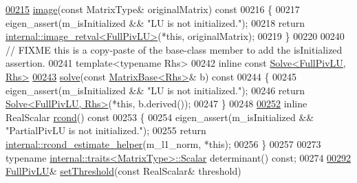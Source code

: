 \begin{DoxyCode}
\hyperlink{group___l_u___module_a0893985d2dab367baa6e57c6fd0c4956}{00215}       \hyperlink{group___l_u___module_a0893985d2dab367baa6e57c6fd0c4956}{image}(\textcolor{keyword}{const} MatrixType& originalMatrix)\textcolor{keyword}{ const}
00216 \textcolor{keyword}{    }\{
00217       eigen\_assert(m\_isInitialized && \textcolor{stringliteral}{"LU is not initialized."});
00218       \textcolor{keywordflow}{return} \hyperlink{struct_eigen_1_1internal_1_1image__retval}{internal::image\_retval<FullPivLU>}(*\textcolor{keyword}{this}, originalMatrix);
00219     \}
00220 
00240     \textcolor{comment}{// FIXME this is a copy-paste of the base-class member to add the isInitialized assertion.}
00241     \textcolor{keyword}{template}<\textcolor{keyword}{typename} Rhs>
00242     \textcolor{keyword}{inline} \textcolor{keyword}{const} \hyperlink{group___core___module_class_eigen_1_1_solve}{Solve<FullPivLU, Rhs>}
\hyperlink{group___l_u___module_af563471f6f3283fd10779ef02dd0b748}{00243}     \hyperlink{group___l_u___module_af563471f6f3283fd10779ef02dd0b748}{solve}(\textcolor{keyword}{const} \hyperlink{group___core___module_class_eigen_1_1_matrix_base}{MatrixBase<Rhs>}& b)\textcolor{keyword}{ const}
00244 \textcolor{keyword}{    }\{
00245       eigen\_assert(m\_isInitialized && \textcolor{stringliteral}{"LU is not initialized."});
00246       \textcolor{keywordflow}{return} \hyperlink{group___core___module_class_eigen_1_1_solve}{Solve<FullPivLU, Rhs>}(*\textcolor{keyword}{this}, b.derived());
00247     \}
00248 
\hyperlink{group___l_u___module_a0bc63f910960dc3e35acecc8442025b6}{00252}     \textcolor{keyword}{inline} RealScalar \hyperlink{group___l_u___module_a0bc63f910960dc3e35acecc8442025b6}{rcond}()\textcolor{keyword}{ const}
00253 \textcolor{keyword}{    }\{
00254       eigen\_assert(m\_isInitialized && \textcolor{stringliteral}{"PartialPivLU is not initialized."});
00255       \textcolor{keywordflow}{return} \hyperlink{namespace_eigen_1_1internal_ad1de0d785387bfb5435c410bf0554068}{internal::rcond\_estimate\_helper}(m\_l1\_norm, *\textcolor{keyword}{this});
00256     \}
00257 
00273     \textcolor{keyword}{typename} \hyperlink{struct_eigen_1_1internal_1_1traits}{internal::traits<MatrixType>::Scalar} determinant() \textcolor{keyword}{const};
00274 
\hyperlink{group___l_u___module_a414592d82de98f5bd075965caf56d681}{00292}     \hyperlink{group___l_u___module_class_eigen_1_1_full_piv_l_u}{FullPivLU}& \hyperlink{group___l_u___module_a414592d82de98f5bd075965caf56d681}{setThreshold}(\textcolor{keyword}{const} RealScalar& threshold)

\end{DoxyCode}
